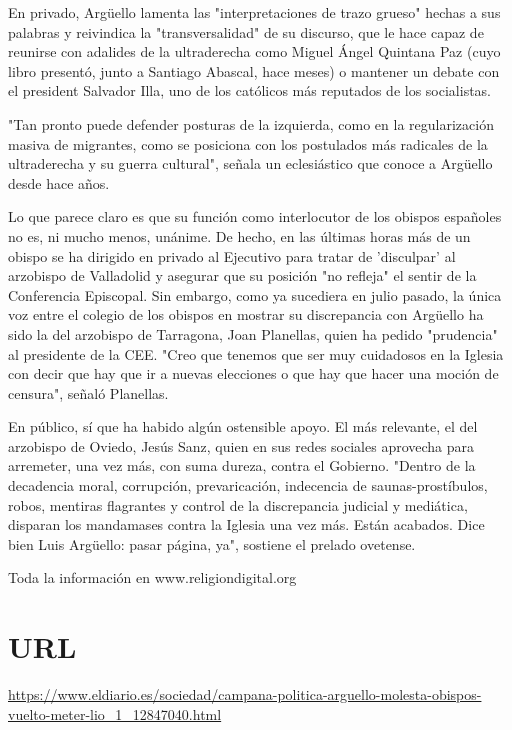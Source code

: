 \documentclass[10pt,a4paper]{article}
\begin{document}
\par\medskip
En privado, Arg\"{u}ello lamenta las "interpretaciones de trazo grueso" hechas a sus palabras y reivindica la "transversalidad" de su discurso, que le hace capaz de reunirse con adalides de la ultraderecha como Miguel \'{A}ngel Quintana Paz (cuyo libro present\'{o}, junto a Santiago Abascal, hace meses) o mantener un debate con el president Salvador Illa, uno de los cat\'{o}licos m\'{a}s reputados de los socialistas.
\par\medskip
"Tan pronto puede defender posturas de la izquierda, como en la regularizaci\'{o}n masiva de migrantes, como se posiciona con los postulados m\'{a}s radicales de la ultraderecha y su guerra cultural", se\~{n}ala un eclesi\'{a}stico que conoce a Arg\"{u}ello desde hace a\~{n}os.
\par\medskip
Lo que parece claro es que su funci\'{o}n como interlocutor de los obispos espa\~{n}oles no es, ni mucho menos, un\'{a}nime. De hecho, en las \'{u}ltimas horas m\'{a}s de un obispo se ha dirigido en privado al Ejecutivo para tratar de 'disculpar' al arzobispo de Valladolid y asegurar que su posici\'{o}n "no refleja" el sentir de la Conferencia Episcopal. Sin embargo, como ya sucediera en julio pasado, la \'{u}nica voz entre el colegio de los obispos en mostrar su discrepancia con Arg\"{u}ello ha sido la del arzobispo de Tarragona, Joan Planellas, quien ha pedido "prudencia" al presidente de la CEE. "Creo que tenemos que ser muy cuidadosos en la Iglesia con decir que hay que ir a nuevas elecciones o que hay que hacer una moci\'{o}n de censura", se\~{n}al\'{o} Planellas.
\par\medskip
En p\'{u}blico, s\'{i} que ha habido alg\'{u}n ostensible apoyo. El m\'{a}s relevante, el del arzobispo de Oviedo, Jes\'{u}s Sanz, quien en sus redes sociales aprovecha para arremeter, una vez m\'{a}s, con suma dureza, contra el Gobierno. "Dentro de la decadencia moral, corrupci\'{o}n, prevaricaci\'{o}n, indecencia de saunas-prost\'{i}bulos, robos, mentiras flagrantes y control de la discrepancia judicial y medi\'{a}tica, disparan los mandamases contra la Iglesia una vez m\'{a}s. Est\'{a}n acabados. Dice bien Luis Arg\"{u}ello: pasar p\'{a}gina, ya", sostiene el prelado ovetense.
\par\medskip
Toda la informaci\'{o}n en www.religiondigital.org
\vspace{1em}

\section*{URL}
\url{ https://www.eldiario.es/sociedad/campana-politica-arguello-molesta-obispos-vuelto-meter-lio\_1\_12847040.html }
\vspace{1em}
\end{document}
